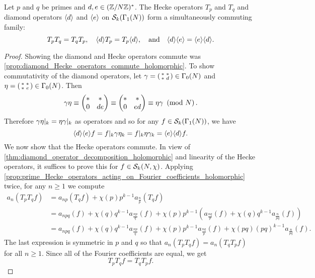     \begin{proposition}\label{prop:Hecke_operators_commute_holomorphic}
      Let $p$ and $q$ be primes and $d,e \in (\mathbb{Z}/N\mathbb{Z})^{\ast}$. The Hecke operators $T_{p}$ and $T_{q}$ and diamond operators $\langle d\rangle$ and $\langle e\rangle$ on $\mathcal{S}_{k}(\Gamma_{1}(N))$ form a simultaneously commuting family:
      \[
        T_{p}T_{q} = T_{q}T_{p}, \quad \langle d\rangle T_{p} = T_{p}\langle d\rangle, \quad \text{and} \quad \langle d\rangle\langle e\rangle = \langle e\rangle\langle d\rangle.
      \]
    \end{proposition}
    \begin{proof}
      Showing the diamond and Hecke operators commute was \cref{prop:diamond_Hecke_operators_commute_holomorphic}. To show commutativity of the diamond operators, let $\gamma = \begin{psmallmatrix} \ast & \ast \\ \ast & d \end{psmallmatrix} \in \Gamma_{0}(N)$  and $\eta = \begin{psmallmatrix} \ast & \ast \\ \ast & e \end{psmallmatrix} \in \Gamma_{0}(N)$. Then
      \[
        \gamma\eta \equiv \begin{pmatrix} \ast & \ast \\ 0 & de \end{pmatrix} \equiv \begin{pmatrix} \ast & \ast \\ 0 & ed \end{pmatrix} \equiv \eta\gamma \ \left(\text{mod }N\right).
      \]
      Therefore $\gamma\eta|_{k} = \eta\gamma|_{k}$ as operators and so for any $f \in \mathcal{S}_{k}(\Gamma_{1}(N))$, we have
      \[
        \langle d\rangle\langle e\rangle f = f|_{k}\gamma\eta_{k} = f|_{k}\eta\gamma_{k} = \langle e\rangle\langle d\rangle f.
      \]
      We now show that the Hecke operators commute. In view of \cref{thm:diamond_operator_decomposition_holomorphic} and linearity of the Hecke operators, it suffices to prove this for $f \in \mathcal{S}_{k}(N,\chi)$. Applying \cref{prop:prime_Hecke_operators_acting_on_Fourier_coefficients_holomorphic} twice, for any $n \ge 1$ we compute
      \begin{align*}
        a_{n}(T_{p}T_{q}f) &= a_{np}(T_{q}f)+\chi(p)p^{k-1}a_{\frac{n}{p}}(T_{q}f) \\
        &= a_{npq}(f)+\chi(q)q^{k-1}a_{\frac{np}{q}}(f)+\chi(p)p^{k-1}(a_{\frac{nq}{p}}(f)+\chi(q)q^{k-1}a_{\frac{n}{pq}}(f)) \\
        &= a_{npq}(f)+\chi(q)q^{k-1}a_{\frac{np}{q}}(f)+\chi(p)p^{k-1}a_{\frac{nq}{p}}(f)+\chi(pq)(pq)^{k-1}a_{\frac{n}{pq}}(f).
      \end{align*}
      The last expression is symmetric in $p$ and $q$ so that $a_{n}(T_{p}T_{q}f) = a_{n}(T_{q}T_{p}f)$ for all $n \ge 1$. Since all of the Fourier coefficients are equal, we get
      \[
        T_{p}T_{q}f = T_{q}T_{p}f.
      \]
    \end{proof}

